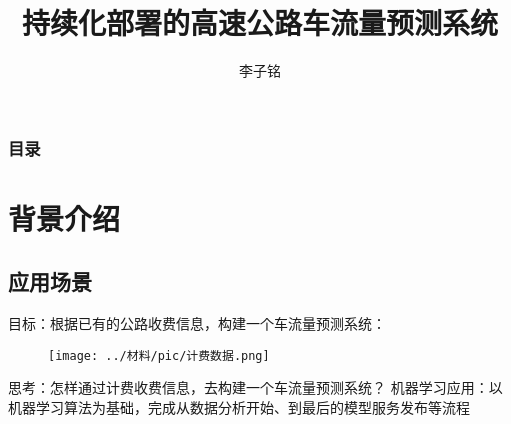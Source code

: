 \documentclass[notheorems, aspectratio=1610]{beamer}
\title[持续化部署的高速公路车流量预测系统]{持续化部署的高速公路车流量预测系统}
\author{李子铭}
\institute[NJU]{liziming-cn@qq.com}
\begin{document}
\begin{frame}[plain]
    \addtolength\textwidth{1.5cm} 
    \setlength\hsize{\textwidth} 
    \setlength\columnwidth{\textwidth}
    \titlepage
   
\end{frame}
\begin{frame}           %
        \addtocounter{framenumber}{-2}%
        \frametitle{目录}
        \thispagestyle{empty}
        \tableofcontents        %
\end{frame}
\section{背景介绍}
\subsection{应用场景}
\begin{frame}
    目标：根据已有的公路收费信息，构建一个车流量预测系统：
    \begin{figure}[h] %
        \flushleft %
        \texttt{[image: ../材料/pic/计费数据.png]} %
    \end{figure}%
    \begin{block}{思考：怎样通过计费收费信息，去构建一个车流量预测系统？}
        机器学习应用：以机器学习算法为基础，完成从数据分析开始、到最后的模型服务发布等流程
    \end{block}
\end{frame}
\end{document}
